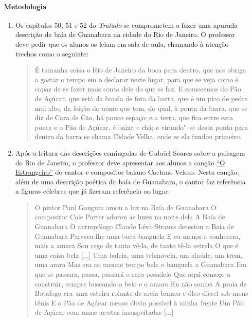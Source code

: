 \documentclass[12pt]{extarticle}
\begin{document}
\paragraph{Metodologia}
\begin{enumerate}

\item Os capítulos 50, 51 e 52 do \textit{Tratado} se comprometem a fazer
uma apurada descrição da baía de Guanabara na cidade do Rio de Janeiro. 
O professor deve pedir que os alunos os leiam em sala de aula, chamando
à atenção trechos como o seguinte:

\begin{quote} É tamanha coisa o Rio de Janeiro da boca para dentro, que 
nos obriga a gastar o tempo em o declarar neste lugar, para que se veja 
como é capaz de se fazer mais conta dele do que se faz. E comecemos do 
Pão de Açúcar, que está da banda de fora da barra, que é um pico de
pedra mui alto, da feição do nome que tem, do qual, à ponta da barra, 
que se diz de Cara de Cão, há pouco espaço; e a terra, que fica entre 
esta ponta e o Pão de Açúcar, é baixa e chã; e virando"--se desta ponta 
para dentro da barra se chama Cidade Velha, onde se ela fundou primeiro.
\end{quote}

\item
Após a leitura das descrições esmiuçadas de Gabriel Soares sobre a 
paisagem do Rio de Janeiro, o professor deve apresentar aos alunos 
a canção \href{https://www.youtube.com/watch?v=uIMZLr7LXVE}{``O Estrangeiro''} do cantor e compositor baiano Caetano Veloso.
Nesta canção, além de uma descrição poética da baía de Guanabara, o 
cantor faz referência a figuras célebres que já fizeram referência ao
lugar. 

\begin{verse}
O pintor Paul Gauguin amou a luz na Baía de Guanabara
O compositor Cole Porter adorou as luzes na noite dela
A Baía de Guanabara
O antropólogo Claude Lévi--Strauss detestou a Baía de Guanabara
Pareceu-lhe uma boca banguela
E eu menos a conhecera, mais a amara
Sou cego de tanto vê-la, de tanto tê-la estrela
O que é uma coisa bela
[...]
Uma baleia, uma telenovela, um alaúde, um trem, uma arara
Mas era ao mesmo tempo bela e banguela a Guanabara
Em que se passara, passa, passará o raro pesadelo
Que aqui começo a construir, sempre buscando o belo e o amaro
Eu não sonhei
A praia de Botafogo era uma esteira rolante de areia branca e óleo diesel sob meus tênis
E o Pão de Açúcar menos óbvio possível à minha frente
Um Pão de Açúcar com umas arestas insuspeitadas
[...]
\end{verse}


\end{enumerate}
\end{document}
